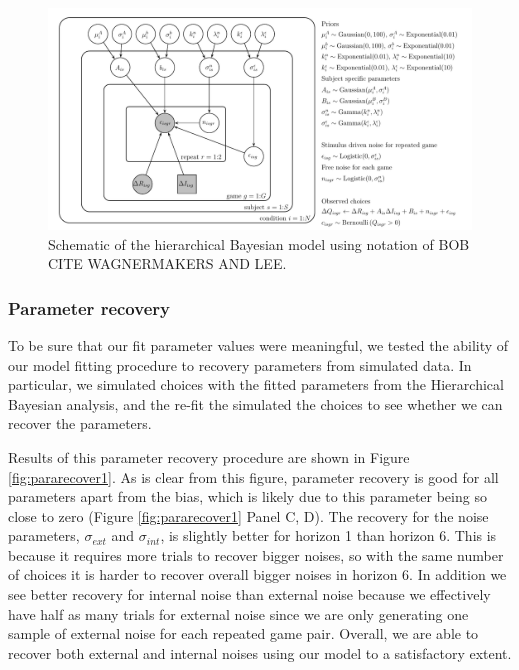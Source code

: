 \documentclass[12pt]{article}
\begin{document}
	\begin{figure}[H]
		\begin{center}
			\includegraphics[width=1\textwidth]{figures/Siyu_EEHorizon_2sigma_final.pdf}
			\caption{Schematic of the hierarchical Bayesian model using notation of BOB CITE WAGNERMAKERS AND LEE.}
			\label{fig:model}
		\end{center}
	\end{figure}
	
	\subsubsection*{Parameter recovery\label{ch:appendix:bayesrecovery}}
	
	To be sure that our fit parameter values were meaningful, we tested the ability of our model fitting procedure to recovery parameters from simulated data.  In particular, we simulated choices with the fitted parameters from the Hierarchical Bayesian analysis, and the re-fit the simulated the choices to see whether we can recover the parameters. 
	
	Results of this parameter recovery procedure are shown in Figure \ref{fig:pararecover1}. As is clear from this figure, parameter recovery is good for all parameters apart from the bias, which is likely due to this parameter being so close to zero (Figure \ref{fig:pararecover1} Panel C, D).  The recovery for the noise parameters, $\sigma_{ext}$ and $\sigma_{int}$, is slightly better for horizon 1 than horizon 6. This is because it requires more trials to recover bigger noises, so with the same number of choices it is harder to recover overall bigger noises in horizon 6. In addition we see better recovery for internal noise than external noise because we effectively have half as many trials for external noise since we are only generating one sample of external noise for each repeated game pair. Overall, we are able to recover both external and internal noises using our model to a satisfactory extent.
	
\end{document}
